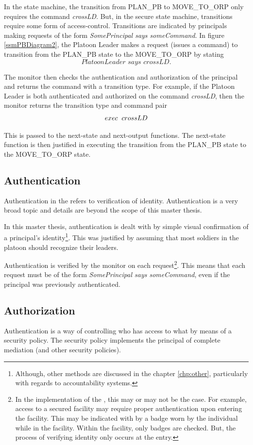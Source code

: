 \documentclass[../../main/main.tex]{subfiles}
\begin{document}
In the state machine, the transition from PLAN_PB to MOVE_TO_ORP only requires the command \textit{crossLD}.  But, in the secure state machine, transitions require some form of access-control.  Transitions are indicated by principals making requests of the form \textit{SomePrincipal says someCommand}.  In figure \ref{ssmPBDiagram2}, the Platoon Leader makes a request (issues a command) to transition from the PLAN_PB state to the MOVE_TO_ORP by stating 
 \[\textit{PlatoonLeader says crossLD}.\]

The monitor then checks the authentication and authorization of the principal and returns the command with a transition type.  For example, if the Platoon Leader is both authenticated and authorized on the command \textit{crossLD}, then the monitor returns the transition type and command pair 
\[exec \hspace{0.2cm} crossLD\]

This is passed to the next-state and next-output functions.  The next-state function is then justified in executing the transition from the PLAN_PB state to the MOVE_TO_ORP state.  

\subsection{Authentication}
Authentication in the  refers to verification of identity.  Authentication is a very broad topic and details are beyond the scope of this master thesis.  

In this master thesis, authentication is dealt with by simple visual confirmation of a principal's identity\footnote{Although, other methods are discussed in the chapter \ref{chp:other}, particularly with regards to accountability systems.}.  This was justified by assuming that most soldiers in the platoon should recognize their leaders.

Authentication is verified by the monitor on each request\footnote{In the implementation of the , this may or may not be the case.  For example, access to a secured facility may require proper authentication upon entering the facility.  This may be indicated with by a badge worn by the individual while in the facility.  Within the facility, only badges are checked.  But, the process of verifying identity only occurs at the entry.}.  This means that each request must be of the form \textit{SomePrincipal says someCommand}, even if the principal was previously authenticated.  

\subsection{Authorization}
Authentication is a way of controlling who has access to what by means of a security policy.  The security policy implements the principal of complete mediation (and other security policies).  
\end{document}

